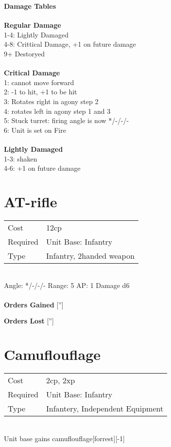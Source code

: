 {\bf Damage Tables} \\
\ \\ {\bf Regular Damage } \\
1-4: Lightly Damaged \\
4-8: Crittical Damage, +1 on future damage \\
9+ Destoryed \\
\ \\ {\bf Critical Damage } \\
1: cannot move forward \\
2: -1 to hit, +1 to be hit \\
3: Rotates right in agony step 2 \\
4: rotates left in agony step 1 and 3 \\
5: Stuck turret: firing angle is now */-/-/- \\
6: Unit is set on Fire \\
\ \\ {\bf Lightly Damaged } \\
1-3: shaken \\
4-6: +1 on future damage \\









\pagebreak\section{ AT-rifle }

\begin{tabular}{ll}
    Cost & 12cp \\
    Required & Unit Base: Infantry\\
    Type & Infantry, 2handed weapon\\
\end{tabular}
\ \\
\indent Angle: */-/-/- Range: 5  AP: 1 Damage d6 \\

\ \\

{\bf Orders Gained}
['']

{\bf Orders Lost}
['']
\section{ Camuflouflage }

\begin{tabular}{ll}
    Cost & 2cp, 2xp \\
    Required & Unit Base: Infantry\\
    Type & Infantery, Independent Equipment\\
\end{tabular}
\ \\
Unit base gains camuflouflage[forrest][-1] \\

